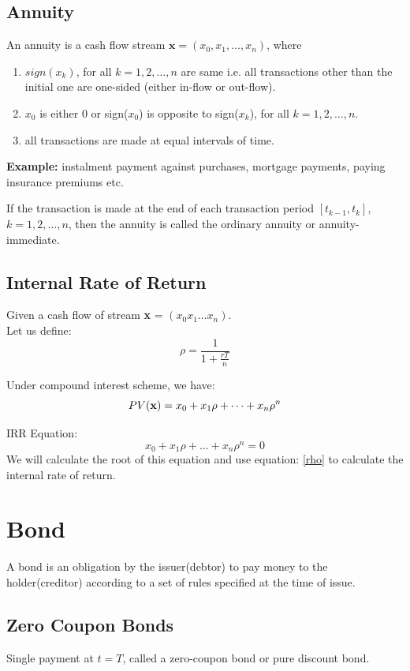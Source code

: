 \documentclass{report}
\begin{document}
\subsection{Annuity}
An annuity is a cash flow stream $\textbf{x} = (x_0,  x_1,  \dots,  x_n)$, where
\begin{enumerate}
    \item $sign(x_k)$, for all $k = 1, 2, \dots, n$ are same i.e. all transactions other than the initial one are one-sided (either in-flow or out-flow).
    \item $x_0$ is either 0 or sign($x_0$) is opposite to sign($x_k$), for all $k = 1, 2, \dots, n$.
    \item all transactions are made at equal intervals of time.
\end{enumerate}

\textbf{Example: }instalment payment against purchases, mortgage payments, paying insurance premiums etc.


If the transaction is made at the end of each transaction period $[t_{k-1}, t_k]$, $k = 1, 2, \dots, n$, then the annuity is called the ordinary annuity or annuity-immediate.


\subsection{Internal Rate of Return}
Given a cash flow of stream \textbf{x} = $(x_0 x_1 \dots x_n)$. \\Let us define:
\begin{equation}
\label{rho}
    \rho = \frac{1}{1+\frac{rT}{n}}
\end{equation}

Under compound interest scheme, we have:
\[PV({\bf x}) = x_0 + x_1\rho + \dots + x_n\rho^n\]


IRR Equation:
\begin{equation}
    x_0 + x_1\rho + \dots + x_n\rho^n = 0
\end{equation}
We will calculate the root of this equation and use equation: \ref{rho} to calculate the internal rate of return.



\section{Bond}
A bond is an obligation by the issuer(debtor) to pay money to the holder(creditor) according to a set of rules specified at the time of issue.

\subsection{Zero Coupon Bonds}
Single payment at $t = T$, called a zero-coupon bond or pure discount bond.
\end{document}
